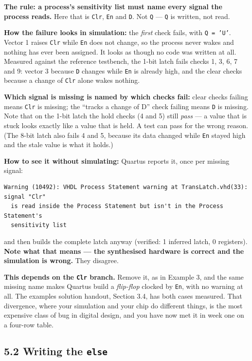 \documentclass[11pt]{article}
\newcommand{\code}[1]{\texttt{#1}}
\begin{document}
\textbf{The rule: a process's sensitivity list must name every signal the process
reads.} Here that is \code{Clr}, \code{En} and \code{D}. Not \code{Q} --- \code{Q}
is written, not read.

\textbf{How the failure looks in simulation:} the \emph{first} check fails, with
\code{Q = 'U'}. Vector 1 raises \code{Clr} while \code{En} does not change, so the
process never wakes and nothing has ever been assigned. It looks as though no code was
written at all. Measured against the reference testbench, the 1-bit latch fails checks
1, 3, 6, 7 and 9: vector 3 because \code{D} changes while \code{En} is already high,
and the clear checks because a change of \code{Clr} alone wakes nothing.

\textbf{Which signal is missing is named by which checks fail:} clear checks failing
means \code{Clr} is missing; the ``tracks a change of D'' check failing means \code{D}
is missing. Note that on the 1-bit latch the hold checks (4 and 5) still \emph{pass} ---
a value that is stuck looks exactly like a value that is held. A test can pass for the
wrong reason. (The 8-bit latch also fails 4 and 5, because its data changed while
\code{En} stayed high and the stale value is what it holds.)

\textbf{How to see it without simulating:} Quartus reports it, once per missing
signal:
\begin{lstlisting}
Warning (10492): VHDL Process Statement warning at TransLatch.vhd(33): signal "Clr"
  is read inside the Process Statement but isn't in the Process Statement's
  sensitivity list
\end{lstlisting}
and then builds the complete latch anyway (verified: 1 inferred latch, 0 registers).
\textbf{Note what that means --- the synthesised hardware is correct and the
simulation is wrong.} They disagree.

\textbf{This depends on the \code{Clr} branch.} Remove it, as in Example 3, and the
same missing name makes Quartus build a \emph{flip-flop} clocked by \code{En}, with no
warning at all. The examples solution handout, Section 3.4, has both cases measured. That divergence,
where your simulation and your chip do different things, is the most expensive class
of bug in digital design, and you have now met it in week one on a four-row table.

\subsection*{5.2 Writing the \code{else}}
\end{document}
